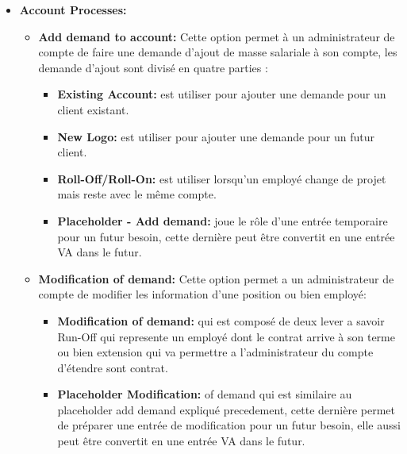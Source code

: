 \begin{itemize}
    \item[\ding{118}] \textbf{Account Processes:}
    
        \vspace{0.5cm}
        \begin{itemize}
            \item[\textbullet] \textbf{Add demand to account:} Cette option permet à un administrateur de compte de faire une demande d'ajout de masse salariale à son compte, les demande d'ajout sont divisé en quatre parties :
            
            \begin{itemize}
                \item[\ding{51}] \textbf{Existing Account:} est utiliser pour ajouter une demande pour un client existant.
                \item[\ding{51}] \textbf{New Logo:} est utiliser pour ajouter une demande pour un futur client.
                \item[\ding{51}] \textbf{Roll-Off/Roll-On:} est utiliser lorsqu’un employé change de projet mais reste avec le même  compte. 
                \item[\ding{51}] \textbf{Placeholder - Add demand:} joue le rôle d'une entrée temporaire pour un futur besoin, cette dernière peut être convertit en une entrée VA dans le futur.
            \end{itemize} 
            
            \newpage
            \item[\textbullet] \textbf{Modification of demand:} Cette option permet a un administrateur de compte de modifier les information d'une position ou bien employé: 
            
            \begin{itemize}
                \item[\ding{51}] \textbf{Modification of demand:} qui est composé de deux lever a savoir Run-Off qui represente un employé dont le contrat arrive à son terme ou bien extension qui va permettre a l'administrateur du compte d'étendre sont contrat.
                \item[\ding{51}] \textbf{Placeholder Modification:} of demand qui est similaire au placeholder add demand expliqué precedement, cette dernière permet de préparer une entrée de modification pour un futur besoin, elle aussi peut être convertit en une entrée VA dans le futur.
            \end{itemize}
            

\end{itemize}
\end{itemize}
